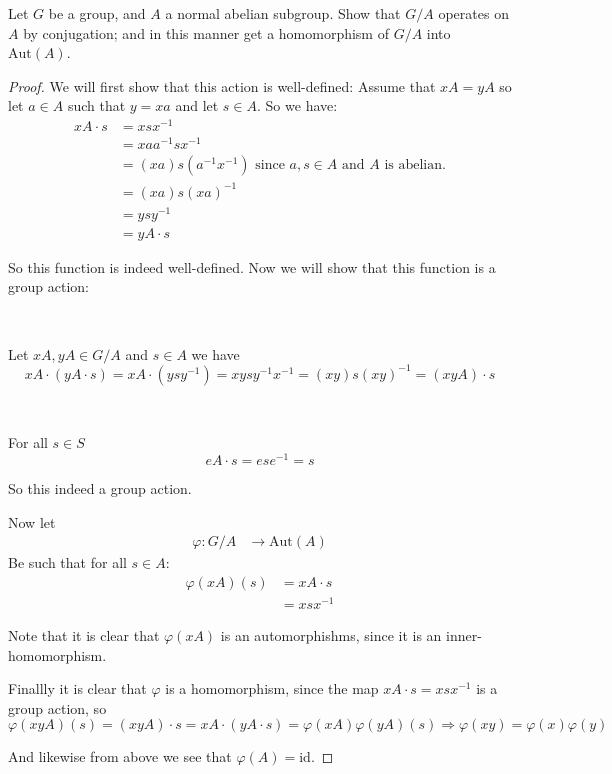     \begin{exercise}
        Let $G$ be a group, and $A$ a normal abelian subgroup. Show that $G/A$ operates on $A$ by conjugation; and in this manner get a homomorphism of $G/A$ into $\text{Aut}(A)$.
    \begin{proof}
        We will first show that this action is well-defined: Assume that $xA = yA$ so let $a\in A$ such that $y = xa$ and let $s\in A$. So we have:\begin{align*}
            xA\cdot s &= xsx^{-1}\\
                     &= xaa^{-1}sx^{-1}\\
                     &= (xa)s(a^{-1}x^{-1}) \text{ since }a,s\in A\text{ and }A \text{ is abelian.}\\
                     &= (xa)s{(xa)}^{-1}\\
                     &= ysy^{-1}\\
                     &= yA\cdot s
        \end{align*}  

        So this function is indeed well-defined. Now we will show that this function is a group action:

        \

        Let $xA, yA\in G/A$ and $s\in A$ we have\begin{equation*}
            xA\cdot (yA\cdot s) = xA\cdot (ysy^{-1}) = xysy^{-1}x^{-1} = (xy)s{(xy)}^{-1} = (xyA)\cdot s
        \end{equation*}
    
        \

        For all $s\in S$\begin{equation*}
            eA\cdot s = ese^{-1} = s
        \end{equation*}
    
        So this indeed a group action.

    Now let \begin{align*}
        \varphi\colon G/A &\rightarrow \text{Aut}(A)
    \end{align*}
    Be such that for all $s\in A$: \begin{align*}
        \varphi(xA)(s) &= xA\cdot s\\
        &= xsx^{-1}
    \end{align*}

    Note that it is clear that $\varphi(xA)$ is an automorphishms, since it is an inner-homomorphism.

    Finallly it is clear that $\varphi$ is a homomorphism, since the map $xA\cdot s = xsx^{-1}$ is a group action, so \[\varphi(xyA)(s) = (xyA)\cdot s = xA\cdot (yA\cdot s) = \varphi(xA)\varphi(yA)(s) \Rightarrow \varphi(xy)=\varphi(x)\varphi(y)\]

    And likewise from above we see that $\varphi(A) = \text{id}$.
    \end{proof}
    \end{exercise}
